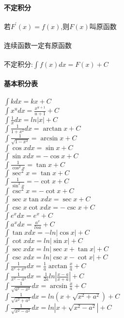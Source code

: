 \documentclass{article}
\begin{document}
\begin{flushleft}
	\fontsize{24pt}{30pt}\selectfont
	
	~\\ \textbf{不定积分} \\~\\
	
	若$F^{'}(x)=f(x)$,则$F(x)$叫原函数\\
	~\\
	连续函数一定有原函数\\
	~\\
	不定积分:$\int f(x)dx=F(x)+C$\\
	
	~\\ \textbf{基本积分表} \\~\\
	
	$\int kdx=kx+C$\\
	$\int x^udx=\frac{x^{u+1}}{u+1}+C$\\
	$\int \frac{1}{x}dx=ln|x|+C$\\
	$\int \frac{1}{1+x^2}dx=\arctan x+C$\\
	$\int \frac{1}{\sqrt{1-x^2}}=\arcsin x+C$\\
	$\int \cos xdx=\sin x+C$\\
	$\int \sin xdx=-\cos x+C$\\
	$\int \frac{1}{\cos^2x}=\tan x+C$\\
	$\int \sec^2x=\tan x+C$\\
	$\int \frac{1}{\sin^2x}=-\cot x+C$\\
	$\int \csc^2x=-\cot x+C$\\
	$\int \sec x\tan xdx=\sec x+C$\\
	$\int \csc x\cot xdx=-\csc x+C$\\
	$\int e^xdx=e^x+C$\\
	$\int a^xdx=\frac{a^x}{lna}+C$\\
	$\int \tan xdx=-ln|\cos x|+C$\\
	$\int \cot xdx=ln|\sin x|+C$\\
	$\int \sec xdx=ln|\sec x+\tan x|+C$\\
	$\int \csc xdx=ln|\csc x-\cot x|+C$\\
	$\int \frac{1}{a^2+x^2}dx=\frac{1}{a}\arctan \frac{x}{a}+C$\\
	$\int \frac{1}{x^2-a^2}dx=\frac{1}{2a}ln|\frac{x-a}{x+a}|+C$\\
	$\int \frac{1}{\sqrt{a^2-x^2}}dx=\arcsin \frac{x}{a}+C$\\
	$\int \frac{1}{\sqrt{x^2+a^2}}dx=ln(x+\sqrt{x^2+a^2})+C$\\
	$\int \frac{1}{\sqrt{x^2-a^2}}dx=ln|x+\sqrt{x^2-a^2}|+C$\\
	

\end{flushleft}
\end{document}
